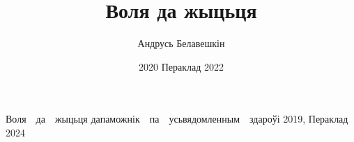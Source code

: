 \documentclass[letterpaper,10pt,openany,twocolumn]{memoir}
\author{Андрусь Белавешкін}
\title{Воля да жыцьця}
\date{2020 Пераклад 2022}
\begin{document}
%

\begin{titlingpage}
      {Воля\ \ да\ \ жыцьця}
      {дапаможнік\ \ па\ \ усьвядомленным\ \ здароўі}
      {2019, Пераклад 2024}

\end{titlingpage}

\pagestyle{headings}
\setcounter{page}{3}
\setcounter{tocdepth}{1}
\tableofcontents*
\clearpage

















\end{document}

